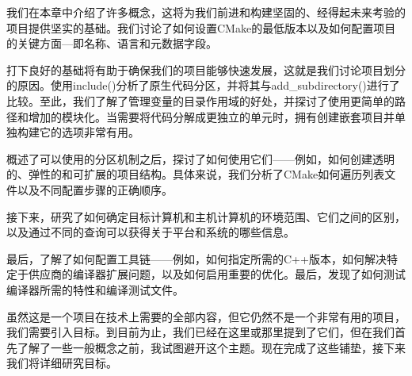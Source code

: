 我们在本章中介绍了许多概念，这将为我们前进和构建坚固的、经得起未来考验的项目提供坚实的基础。我们讨论了如何设置CMake的最低版本以及如何配置项目的关键方面—即名称、语言和元数据字段。

打下良好的基础将有助于确保我们的项目能够快速发展，这就是我们讨论项目划分的原因。使用include()分析了原生代码分区，并将其与add\_subdirectory()进行了比较。至此，我们了解了管理变量的目录作用域的好处，并探讨了使用更简单的路径和增加的模块化。当需要将代码分解成更独立的单元时，拥有创建嵌套项目并单独构建它的选项非常有用。

概述了可以使用的分区机制之后，探讨了如何使用它们——例如，如何创建透明的、弹性的和可扩展的项目结构。具体来说，我们分析了CMake如何遍历列表文件以及不同配置步骤的正确顺序。

接下来，研究了如何确定目标计算机和主机计算机的环境范围、它们之间的区别，以及通过不同的查询可以获得关于平台和系统的哪些信息。

最后，了解了如何配置工具链——例如，如何指定所需的C++版本，如何解决特定于供应商的编译器扩展问题，以及如何启用重要的优化。最后，发现了如何测试编译器所需的特性和编译测试文件。

虽然这是一个项目在技术上需要的全部内容，但它仍然不是一个非常有用的项目，我们需要引入目标。到目前为止，我们已经在这里或那里提到了它们，但在我们首先了解了一些一般概念之前，我试图避开这个主题。现在完成了这些铺垫，接下来我们将详细研究目标。